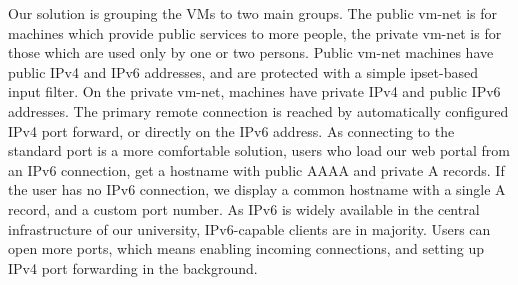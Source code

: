 \documentclass{llncs}
\begin{document}
Our solution is grouping the VMs to two main groups. The public vm-net is for machines which provide public services to more people, the private vm-net is for those which are used only by one or two persons. Public vm-net machines have public IPv4 and IPv6 addresses, and are protected with a simple ipset-based input filter. On the private vm-net, machines have private IPv4 and public IPv6 addresses. The primary remote connection is reached by automatically configured IPv4 port forward, or directly on the IPv6 address. As connecting to the standard port is a more comfortable solution, users who load our web portal from an IPv6 connection, get a hostname with public AAAA and private A records. If the user has no IPv6 connection, we display a common hostname with a single A record, and a custom port number. As IPv6 is widely available in the central infrastructure of our university, IPv6-capable clients are in majority. Users can open more ports, which means enabling incoming connections, and setting up IPv4 port forwarding in the background.
\end{document}
